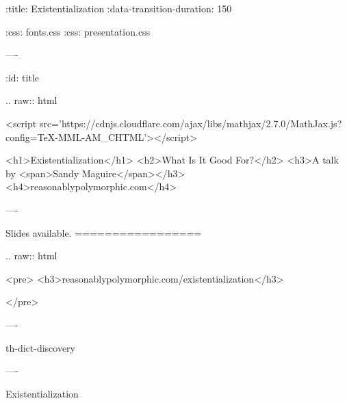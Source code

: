 :title: Existentialization
:data-transition-duration: 150

:css: fonts.css
:css: presentation.css


\newenvironment{table}{.. raw:: html

  <table>}{
  </table>
}

\newenvironment{hs}{.. code:: haskell
}{}
\newenvironment{raw}{.. raw:: html

  <pre>}{
  </pre>
}
\newenvironment{error}{.. raw:: html

  <pre class="error">}{    </pre>
}
\newenvironment{custom}{.. raw:: html

  <pre class="highlight code haskell">}{
  </pre>
}
\newcommand{\$}{\begin{verbatim}$\end{verbatim}}
\newcommand{\todo}[2]{#2}
\newcommand{\note}[1]{<span class="new">#1</span>}
\newcommand{\wat}[1]{<span class="wat">#1</span>}
\newcommand{\type}[1]{<span class="type">#1</span>}
\newcommand{\kind}[1]{<span class="kind">#1</span>}
\newcommand{\syn}[2]{<span class="#1">#2</span>}
\newcommand{\pragma}[1]{\{-# LANGUAGE #1 #-\}}
\newcommand{\pragmasyn}[1]{\syn{cm}{\{-# LANGUAGE #1 #-\}}}
\newcommand{\b}[1]{<pre class="highlight haskell code">#1</pre>}

----

:id: title

.. raw:: html

  <script src='https://cdnjs.cloudflare.com/ajax/libs/mathjax/2.7.0/MathJax.js?config=TeX-MML-AM_CHTML'></script>

  <h1>Existentialization</h1>
  <h2>What Is It Good For?</h2>
  <h3>A talk by <span>Sandy Maguire</span></h3>
  <h4>reasonablypolymorphic.com</h4>

----

Slides available.
=================

\begin{raw}
  <h3>reasonablypolymorphic.com/existentialization</h3>
\end{raw}

----

th-dict-discovery

----

Existentialization

